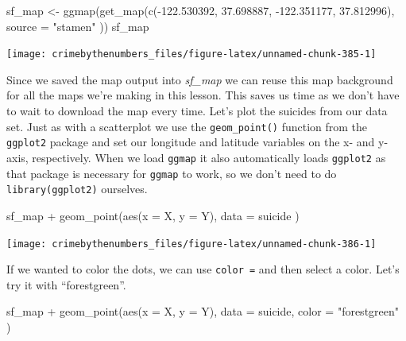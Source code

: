 \documentclass[
]{krantz}
\makeatletter
\newenvironment{Shaded}{\begin{snugshade}}{\end{snugshade}}
\newcommand{\AttributeTok}[1]{\textcolor[rgb]{0.61,0.61,0.61}{#1}}
\newcommand{\FloatTok}[1]{\textcolor[rgb]{0.06,0.06,0.06}{#1}}
\newcommand{\FunctionTok}[1]{\textcolor[rgb]{0,0,0}{#1}}
\newcommand{\NormalTok}[1]{#1}
\newcommand{\OtherTok}[1]{\textcolor[rgb]{0.37,0.37,0.37}{#1}}
\newcommand{\SpecialCharTok}[1]{\textcolor[rgb]{0,0,0}{#1}}
\newcommand{\StringTok}[1]{\textcolor[rgb]{0.5,0.5,0.5}{#1}}
\newenvironment{kframe}{%
\medskip{}
\setlength{\fboxsep}{.8em}
 \def\at@end@of@kframe{}%
 \ifinner\ifhmode%
  \def\at@end@of@kframe{\end{minipage}}%
  \begin{minipage}{\columnwidth}%
 \fi\fi%
 \def\FrameCommand##1{\hskip\@totalleftmargin \hskip-\fboxsep
 \colorbox{shadecolor}{##1}\hskip-\fboxsep
     \hskip-\linewidth \hskip-\@totalleftmargin \hskip\columnwidth}%
 \MakeFramed {\advance\hsize-\width
   \@totalleftmargin\z@ \linewidth\hsize
   \@setminipage}}%
 {\par\unskip\endMakeFramed%
 \at@end@of@kframe}
\renewenvironment{Shaded}{\begin{kframe}}{\end{kframe}}
\makeatother
\begin{document}
\begin{Shaded}
\begin{Highlighting}[]
\NormalTok{sf\_map }\OtherTok{\textless{}{-}} \FunctionTok{ggmap}\NormalTok{(}\FunctionTok{get\_map}\NormalTok{(}\FunctionTok{c}\NormalTok{(}\SpecialCharTok{{-}}\FloatTok{122.530392}\NormalTok{, }\FloatTok{37.698887}\NormalTok{, }\SpecialCharTok{{-}}\FloatTok{122.351177}\NormalTok{, }\FloatTok{37.812996}\NormalTok{),}
  \AttributeTok{source =} \StringTok{"stamen"}
\NormalTok{))}
\NormalTok{sf\_map}
\end{Highlighting}
\end{Shaded}

\begin{center}\texttt{[image: crimebythenumbers\_files/figure-latex/unnamed-chunk-385-1]} \end{center}

Since we saved the map output into \emph{sf\_map} we can
reuse this map background for all the maps we're making in
this lesson. This saves us time as we don't have to wait to
download the map every time. Let's plot the suicides from
our data set. Just as with a scatterplot we use the
\texttt{geom\_point()} function from the \texttt{ggplot2}
package and set our longitude and latitude variables on the
x- and y-axis, respectively. When we load \texttt{ggmap} it
also automatically loads \texttt{ggplot2} as that package is
necessary for \texttt{ggmap} to work, so we don't need to do
\texttt{library(ggplot2)} ourselves.

\begin{Shaded}
\begin{Highlighting}[]
\NormalTok{sf\_map }\SpecialCharTok{+}
  \FunctionTok{geom\_point}\NormalTok{(}\FunctionTok{aes}\NormalTok{(}\AttributeTok{x =}\NormalTok{ X, }\AttributeTok{y =}\NormalTok{ Y),}
    \AttributeTok{data =}\NormalTok{ suicide}
\NormalTok{  )}
\end{Highlighting}
\end{Shaded}

\begin{center}\texttt{[image: crimebythenumbers\_files/figure-latex/unnamed-chunk-386-1]} \end{center}

If we wanted to color the dots, we can use \texttt{color\ =}
and then select a color. Let's try it with ``forestgreen''.

\begin{Shaded}
\begin{Highlighting}[]
\NormalTok{sf\_map }\SpecialCharTok{+}
  \FunctionTok{geom\_point}\NormalTok{(}\FunctionTok{aes}\NormalTok{(}\AttributeTok{x =}\NormalTok{ X, }\AttributeTok{y =}\NormalTok{ Y),}
    \AttributeTok{data  =}\NormalTok{ suicide,}
    \AttributeTok{color =} \StringTok{"forestgreen"}
\NormalTok{  )}
\end{Highlighting}
\end{Shaded}
\end{document}
